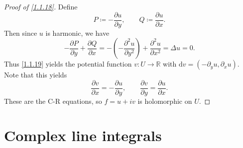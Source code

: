 \begin{proof}[Proof of \cref{1.1.18}]
	Define
	\[
		P\coloneqq -\frac{\partial u}{\partial y} ,\qquad Q\coloneqq \frac{\partial u}{\partial x} 
	.\]
	Then since $u$ is harmonic, we have
	\[
		-\frac{\partial P}{\partial y} +\frac{\partial Q}{\partial x} =-\left(-\frac{\partial ^2u}{\partial y^2}\right) +\frac{\partial ^2u}{\partial x^2} =\Delta u=0
	.\]
	Thus \cref{1.1.19} yields the potential function $v : U \to \mathbb{R} $ with $\mathrm{d} v =(-\partial _yu,\partial _xu)$. Note that this yields
	\[
		\frac{\partial v}{\partial x} =-\frac{\partial u}{\partial y} ,\qquad \frac{\partial v }{\partial y} =\frac{\partial u}{\partial x} 
	.\]
	These are the C-R equations, so $f=u+iv $ is holomorphic on $U$. 
\end{proof}

\chapter{Complex line integrals}

